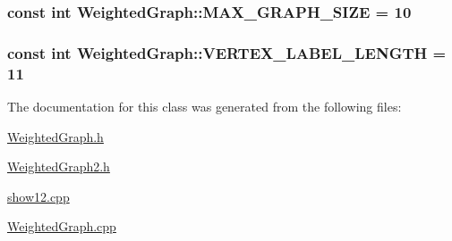 \hypertarget{class_weighted_graph_af9b34017e5b494cd3aca2dbc8335fc3c}{
\subsubsection[{M\-A\-X\-\_\-\-G\-R\-A\-P\-H\-\_\-\-S\-I\-Z\-E}]{\setlength{\rightskip}{0pt plus 5cm}const int Weighted\-Graph\-::\-M\-A\-X\-\_\-\-G\-R\-A\-P\-H\-\_\-\-S\-I\-Z\-E = 10\hspace{0.3cm}{\ttfamily [static]}}}\label{class_weighted_graph_af9b34017e5b494cd3aca2dbc8335fc3c}
\hypertarget{class_weighted_graph_a19411776f4ee4e2a68bf2bc5e03aa10b}{
\subsubsection[{V\-E\-R\-T\-E\-X\-\_\-\-L\-A\-B\-E\-L\-\_\-\-L\-E\-N\-G\-T\-H}]{\setlength{\rightskip}{0pt plus 5cm}const int Weighted\-Graph\-::\-V\-E\-R\-T\-E\-X\-\_\-\-L\-A\-B\-E\-L\-\_\-\-L\-E\-N\-G\-T\-H = 11\hspace{0.3cm}{\ttfamily [static]}}}\label{class_weighted_graph_a19411776f4ee4e2a68bf2bc5e03aa10b}


The documentation for this class was generated from the following files\-:\begin{DoxyCompactItemize}
\item 
\hyperlink{_weighted_graph_8h}{Weighted\-Graph.\-h}\item 
\hyperlink{_weighted_graph2_8h}{Weighted\-Graph2.\-h}\item 
\hyperlink{show12_8cpp}{show12.\-cpp}\item 
\hyperlink{_weighted_graph_8cpp}{Weighted\-Graph.\-cpp}\end{DoxyCompactItemize}
